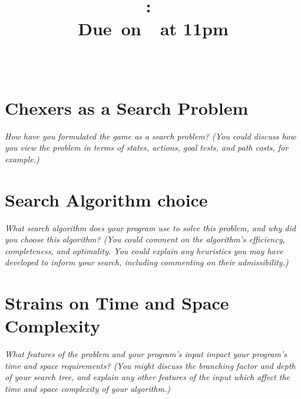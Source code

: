 \documentclass{article}[11pt]
\title{
    \vspace{2in}
    \textmd{\textbf{\hmwkClass:\ \hmwkTitle}}\\
    \normalsize\vspace{0.1in}\small{Due\ on\ \hmwkDueDate\ at 11pm}\\
    \vspace{0.1in}\large{\textit{\hmwkClassInstructor\ \hmwkClassTime}}
    \vspace{3in}
}
\author{\hmwkAuthorName}
\date{}
\theoremstyle{plain}
\theoremstyle{definition}
\begin{document}
\maketitle

\pagebreak

\section{Chexers as a Search Problem}

\textit{How have you formulated the game as a search problem? (You could discuss how you view the problem in terms of states, actions, goal tests, and path costs, for example.)}

\section{Search Algorithm choice}

\textit{What search algorithm does your program use to solve this problem, and why did you choose this algorithm? (You could comment on the algorithm’s efficiency, completeness, and optimality. You could explain any heuristics you may have developed to inform your search, including commenting on their admissibility.)}

\section{Strains on Time and Space Complexity}

\textit{What features of the problem and your program’s input impact your program’s time and space requirements? (You might discuss the branching factor and depth of your search tree, and explain any other features of the input which affect the time and space complexity of your algorithm.)}
\end{document}
